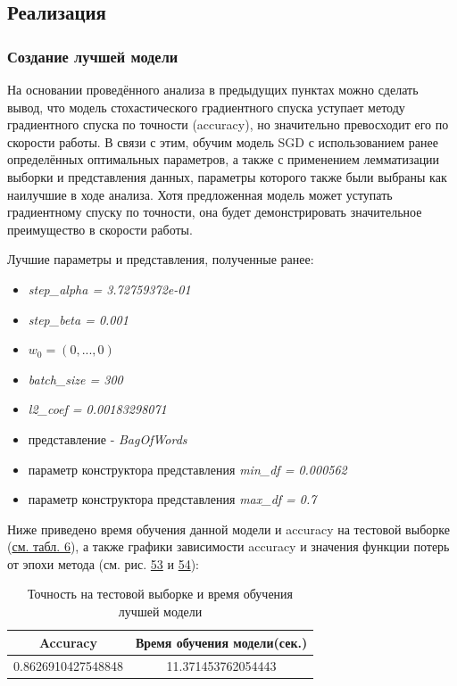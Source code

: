 \documentclass[14pt]{extarticle}
\begin{document}
\subsection{Реализация}

\subsubsection{Создание лучшей модели}

На основании проведённого анализа в предыдущих пунктах можно сделать вывод, что модель стохастического градиентного спуска уступает методу градиентного спуска по точности (accuracy), но значительно превосходит его по скорости работы. В связи с этим, обучим модель SGD с использованием ранее определённых оптимальных параметров, а также с применением лемматизации выборки и представления данных, параметры которого также были выбраны как наилучшие в ходе анализа. Хотя предложенная модель может уступать градиентному спуску по точности, она будет демонстрировать значительное преимущество в скорости работы.

Лучшие параметры и представления, полученные ранее:
\begin{itemize}
    \item \textit{step\_alpha = 3.72759372e-01}
    \item \textit{step\_beta = 0.001}
    \item \textit{$w_0 = (0, ... , 0)$} 
    \item \textit{batch\_size = 300}
    \item \textit{l2\_coef = 0.00183298071}
    \item представление - \textit{BagOfWords}
    \item параметр конструктора представления \textit{min\_df = 0.000562}
    \item параметр конструктора представления \textit{max\_df = 0.7}
\end{itemize}

Ниже приведено время обучения данной модели и accuracy на тестовой выборке (\hyperref[tab:exp_9_best_model_acc_time]{см. табл. 6}), а также графики зависимости accuracy и значения функции потерь от эпохи метода  (см. рис. \hyperref[fig:exp_9_acc]{53} и \hyperref[fig:exp_9_loss]{54}):

\begin{table}[H]
    \centering
    \begin{tabular}{|c|c|}
        \hline
        Accuracy & Время обучения модели(сек.) \\ \hline
        0.8626910427548848 & 11.371453762054443 \\ \hline
    \end{tabular}
    \caption{Точность на тестовой выборке и время обучения лучшей модели}
    \label{tab:exp_9_best_model_acc_time}
\end{table}
\end{document}
